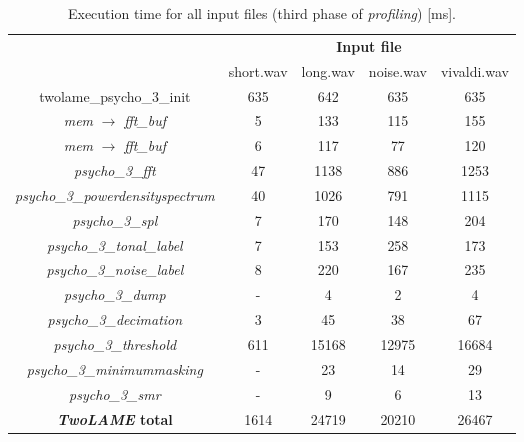 \begin{table}[H]
    \centering
    \begin{tabular}{|c|c|c|c|c|}
    \cline{2-5}
    \multicolumn{1}{c|}{}  & \multicolumn{4}{c|}{\textbf{Input file}} \\
    \cline{2-5}
    \multicolumn{1}{c|}{} & short.wav & long.wav & noise.wav & vivaldi.wav \\
    \hline
    \multicolumn{1}{|c|}{twolame\_psycho\_3\_init}  & 635 & 642 & 635 & 635 \\ 
   \hline
    \multicolumn{1}{|c|}{\textit{mem} $\rightarrow$ \textit{fft\_buf}} & 5 & 133 & 115 & 155 \\ 
    \hline
     \multicolumn{1}{|c|}{\textit{mem} $\rightarrow$ \textit{fft\_buf}} &  6 &  117& 77 &  120 \\ 
    \hline
     \multicolumn{1}{|c|}{\textit{psycho\_3\_fft}} & 47 & 1138 & 886 &  1253  \\ 
    \hline
     \multicolumn{1}{|c|}{\textit{psycho\_3\_powerdensityspectrum}} & 40  & 1026 & 791 &  1115  \\ 
    \hline
     \multicolumn{1}{|c|}{\textit{psycho\_3\_spl}} &  7 & 170 & 148 & 204  \\ 
    \hline
      \multicolumn{1}{|c|}{\textit{psycho\_3\_tonal\_label}} &  7 & 153 & 258 & 173  \\ 
     \hline
     \multicolumn{1}{|c|}{\textit{psycho\_3\_noise\_label}} & 8 & 220 & 167 & 235  \\ 
    \hline
     \multicolumn{1}{|c|}{\textit{psycho\_3\_dump}} &  - & 4 & 2 & 4  \\ 
    \hline
     \multicolumn{1}{|c|}{\textit{psycho\_3\_decimation}} & 3 & 45 & 38 & 67   \\
    \hline
     \multicolumn{1}{|c|}{\textit{psycho\_3\_threshold}} & 611 & 15168  & 12975 &  16684 \\
    \hline
     \multicolumn{1}{|c|}{\textit{psycho\_3\_minimummasking}} & - & 23 & 14 & 29  \\ 
    \hline
     \multicolumn{1}{|c|}{\textit{psycho\_3\_smr}} & - & 9 & 6 & 13  \\ 
    \hline
    \multicolumn{1}{|c|}{\textbf{\textit{TwoLAME} total}}  & 1614 & 24719 & 20210 & 26467 \\ 
    \hline
    \end{tabular}
    \caption{Execution time for all input files (third phase of \textit{profiling}) [ms].}
    \label{profiling3}
\end{table}

